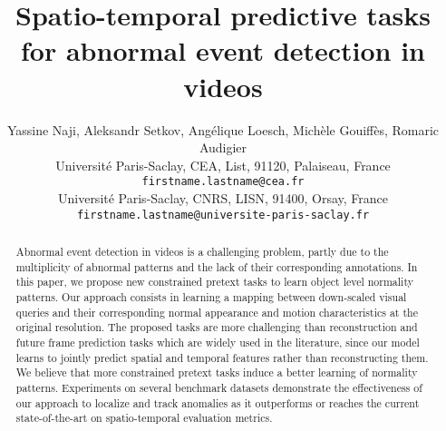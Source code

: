 \documentclass[10pt,twocolumn,oneside,letterpaper]{article}
\begin{document}
\title{Spatio-temporal predictive tasks for abnormal event detection in videos}

\author{{ {Yassine Naji, Aleksandr Setkov, Angélique Loesch, Michèle Gouiffès, Romaric Audigier}}\\
{\normalsize Université Paris-Saclay, CEA, List, 91120, Palaiseau, France} \\  
{\tt\small firstname.lastname@cea.fr}
\\
{\normalsize  Université Paris-Saclay, CNRS, LISN, 91400, Orsay, France}
\\
{\tt\small firstname.lastname@universite-paris-saclay.fr}
}




\maketitle
\thispagestyle{empty}

\newcommand{\blue}[1]{\textcolor{black}{#1}}
\newcommand{\green}[1]{\textcolor{black}{#1}}


\begin{abstract}
  Abnormal event detection in videos is a challenging problem, partly due to the multiplicity of abnormal patterns and the lack of their corresponding annotations. In this paper, we propose new constrained pretext tasks to learn object level normality patterns. Our approach consists in learning a mapping between down-scaled visual queries and their corresponding normal appearance and motion characteristics at the original resolution. The proposed tasks are more challenging than reconstruction and future frame prediction tasks which are widely used in the literature, since our model learns to jointly predict spatial and temporal features rather than reconstructing them. We believe that more constrained pretext tasks induce a better learning of normality patterns. Experiments on several benchmark datasets demonstrate the effectiveness of our approach to localize and track anomalies as it outperforms or reaches the current state-of-the-art on spatio-temporal evaluation metrics.
\end{abstract}
\end{document}
